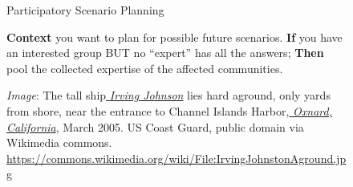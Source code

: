 \documentclass{article}
\begin{document}
\begin{figure}[p]
\begin{adjustbox}{minipage=[c]{\textwidth-10mm},margin= 5mm 5mm 5mm 5mm, frame=1pt, bgcolor=almond,env=center}
\begin{center}
\begin{minipage}[t]{0.7\paperwidth}
{\huge Participatory Scenario Planning}
\bigskip

\Large
\textbf{Context} you want to plan for possible future scenarios.\newline
\textbf{If} you have an interested group BUT no “expert” has all the answers;\newline
\textbf{Then} pool the collected expertise of the affected communities.\newline
\end{minipage}
\end{center}
\caption*{\emph{Image}:
The tall ship\href{https://en.wikipedia.org/wiki/Irving_Johnson_(ship)}{
}\href{https://en.wikipedia.org/wiki/Irving_Johnson_(ship)}{\emph{Irving
Johnson}} lies hard aground, only yards from shore, near the entrance to
Channel Islands
Harbor,\href{https://en.wikipedia.org/wiki/Oxnard,_California}{
}\href{https://en.wikipedia.org/wiki/Oxnard,_California}{\emph{Oxnard,
California}}, March 2005. US Coast Guard, public domain via Wikimedia commons.\newline 
\url{https://commons.wikimedia.org/wiki/File:IrvingJohnstonAground.jpg}}
\end{adjustbox}
\end{figure}

\end{document}
